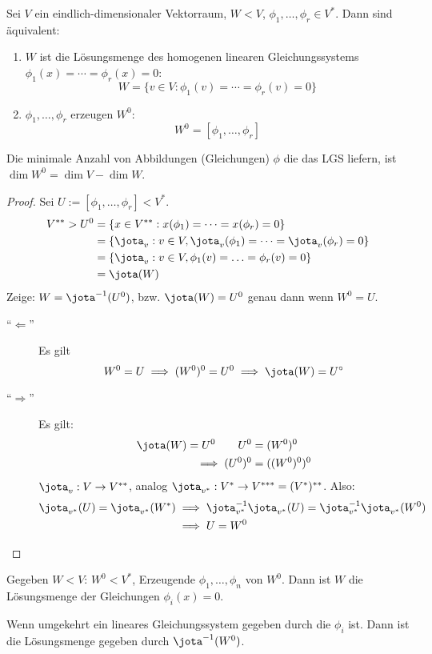 \documentclass[a4paper, 10pt]{scrbook}
\begin{document}
\begin{kor}
\label{kor:9.9}
Sei $V$ ein eindlich-dimensionaler Vektorraum, $W<V$, $\phi_1,\dotsc,\phi_r\in V^*$.
Dann sind äquivalent:
\begin{enumerate}
\item $W$ ist die Lösungsmenge des homogenen linearen Gleichungssystems $\phi_1(x)=\dotsb=\phi_r(x)=0$:
	\[
		W=\{v\in V:\phi_1(v)=\dotsb=\phi_r(v)=0\}
	\]
\item $\phi_1,\dotsc,\phi_r$ erzeugen $W^0$:
	\[
		W^0=[\phi_1,\dotsc,\phi_r]
	\]
\end{enumerate}
Die minimale Anzahl von Abbildungen (Gleichungen) $\phi$ die das LGS liefern, ist $\dim W^0=\dim V-\dim W$.

\begin{proof}
Sei $U:=[\phi_1,\dotsc,\phi_r]<V^*$.
\begin{align*}
V^{**}>U^0&=\{x\in V^{**}:x(\phi_1)=\dotsb=x(\phi_r)=0\}\\
&=\{\jota_v:v\in V, \jota_v(\phi_1)=\dotsb=\jota_v(\phi_r)=0\}\\
&=\{\jota_v:v\in V, \phi_1(v)=\dotsc=\phi_r(v)=0\}\\
&=\jota(W)
\end{align*}
Zeige: $W=\jota^{-1}(U^0)$, bzw. $\jota(W)=U^0$ genau dann wenn $W^0=U$.
\begin{description}
\item[``$\Longleftarrow$''] Es gilt
\[
W^0=U \implies (W^0)^0=U^0 \implies \jota(W)=U^\circ
\]
\item[``$\Longrightarrow$'']
Es gilt:
\begin{align*}
\jota(W)=U^0 \qquad U^0&=(W^0)^0\\
\implies (U^0)^0 &= ((W^0)^0)^0
\end{align*}
$\jota_v:V\to V^{**}$, analog $\jota_{v^*}:V^*\to V^{***}=(V^*)^{**}$.
Also:
\begin{align*}
\jota_{v^*}(U)=\jota_{v^*}(W^*) &\implies \jota_{v^*}^{-1}\jota_{v^*}(U)=\jota_{v^*}^{-1}\jota_{v^*}(W^0) \\
&\implies U=W^0
\end{align*}
\end{description}
\end{proof}
\end{kor}

Gegeben $W<V$: $W^0<V^*$, Erzeugende $\phi_1,\dotsc,\phi_n$ von $W^0$.
Dann ist $W$ die Lösungsmenge der Gleichungen $\phi_i(x)=0$.

Wenn umgekehrt ein lineares Gleichungssystem gegeben durch die $\phi_i$ ist.
Dann ist die Lösungsmenge gegeben durch $\jota^{-1}(W^0)$.
\end{document}
